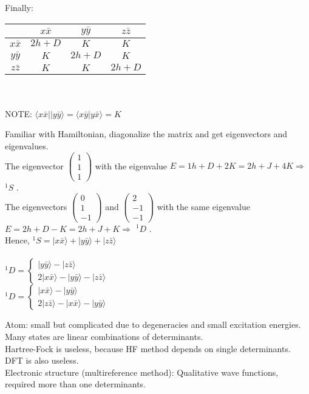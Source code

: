 \documentclass[a4paper, 12pt]{article}
\begin{document}
\begin{itemize}
 
Finally: 
	\begin{center}
\begin{tabular}{|c|c|c|c|} 
\hline 
 & $x\bar{x}$ & $y\bar{y}$  &$z\bar{z}$\\
\hline  
$x\bar{x}$ & $2h+D$ & $K$ & $K$\\
\hline  
$y\bar{y}$  & $K$ &$2h+D$ & $K$\\
\hline  
$z\bar{z}$ & $K$ & $K$ & $2h+D$\\
\hline
\end{tabular}
\\ \hspace*{\fill} \\
NOTE: $\langle x\bar{x}||y\bar{y} \rangle =\langle x\bar{y}|y\bar{x} \rangle = K $
\end{center}
Familiar with Hamiltonian, diagonalize the matrix and get eigenvectors and eigenvalues.\\
The eigenvector $\left( \begin{array}{ccc}
   1 \\ 1 \\1 \end{array} \right)$ with the eigenvalue $E= 1h+D+2K =2h+J+4K \Rightarrow$  $^1S$ .\\
The eigenvectors $\left( \begin{array}{ccc}
   0 \\ 1 \\-1 \end{array} \right)$ and $\left( \begin{array}{ccc}
   2 \\ -1 \\-1 \end{array} \right)$ with the same eigenvalue $E= 2h+D-K =2h+J+K \Rightarrow$  $^1D$ .\\   
 Hence, $^1S =|x\bar{x}\rangle+|y\bar{y}\rangle+|z\bar{z}\rangle$
 \\ \hspace*{\fill} \\
 \tab\quad  $^1D = \left\{ \begin{aligned}
       |y\bar{y}\rangle - |z\bar{z}\rangle \\ 2|x\bar{x}\rangle-|y\bar{y}\rangle-|z\bar{z}\rangle 
       \end{aligned}\right.$\\
 \tab\quad  $^1D = \left\{ \begin{aligned}
       |x\bar{x}\rangle - |y\bar{y}\rangle \\ 2|z\bar{z}\rangle-|x\bar{x}\rangle-|y\bar{y}\rangle 
       \end{aligned}\right.$
\end{itemize}



Atom: small but complicated due to degeneracies and small excitation energies. Many states are linear combinations of determinants. \\
\tab Hartree-Fock is useless, because HF method depends on single determinants.\\
\tab DFT is also useless. \\
\tab Electronic structure (multireference method): Qualitative wave functions, required more than one determinants.
\end{document}
